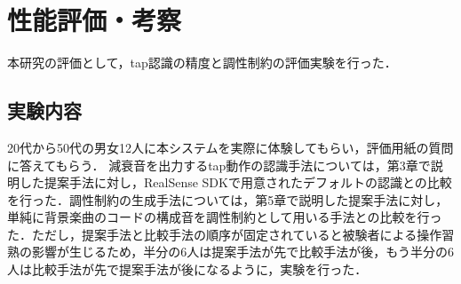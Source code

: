 \chapter{性能評価・考察}
本研究の評価として，tap認識の精度と調性制約の評価実験を行った．
\section{実験内容}
20代から50代の男女12人に本システムを実際に体験してもらい，評価用紙の質問に答えてもらう．
減衰音を出力するtap動作の認識手法については，第3章で説明した提案手法に対し，RealSense SDKで用意されたデフォルトの認識との比較を行った．調性制約の生成手法については，第5章で説明した提案手法に対し，単純に背景楽曲のコードの構成音を調性制約として用いる手法との比較を行った．ただし，提案手法と比較手法の順序が固定されていると被験者による操作習熟の影響が生じるため，半分の6人は提案手法が先で比較手法が後，もう半分の6人は比較手法が先で提案手法が後になるように，実験を行った．
